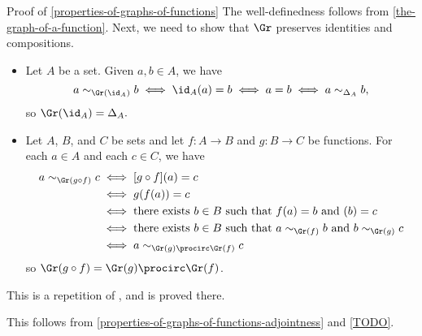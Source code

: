 \begin{Proof}{Proof of \cref{properties-of-graphs-of-functions}}%
    The well-definedness follows from \cref{the-graph-of-a-function}. Next, we need to show that $\Gr$ preserves identities and compositions.
    \begin{itemize}
        \item{}Let $A$ be a set. Given $a,b\in A$, we have
            \[ a \sim_{\Gr(\id_{A})} b \iff \id_{A}(a) = b \iff a = b \iff a \sim_{\Delta_{A}} b, \]
            so $\Gr(\id_{A}) = \Delta_{A}.$
        \item{}Let $A$, $B$, and $C$ be sets and let $f \colon A \to B$ and $g \colon B \to C$ be functions. For each $a\in A$ and each $c \in C$, we have
            \begin{align*}
                a \sim_{\Gr (g \circ f)} c &\iff [g \circ f](a) = c\\
                                           &\iff g(f(a)) = c\\
                                           &\iff \text{there exists $b \in B$ such that $f(a) = b$ and $(b) = c$}\\
                                           &\iff \text{there exists $b \in B$ such that $a \sim_{\Gr(f)} b$ and $b \sim_{\Gr(g)} c$} \\
                                           &\iff a \sim_{\Gr(g) \procirc \Gr(f)} c
            \end{align*}
            so $\Gr(g \circ f) = \Gr(g) \procirc \Gr(f)$.
    \end{itemize}

    This is a repetition of , and is proved there.

    This follows from \cref{properties-of-graphs-of-functions-adjointness} and \cref{TODO}.


\end{Proof}
